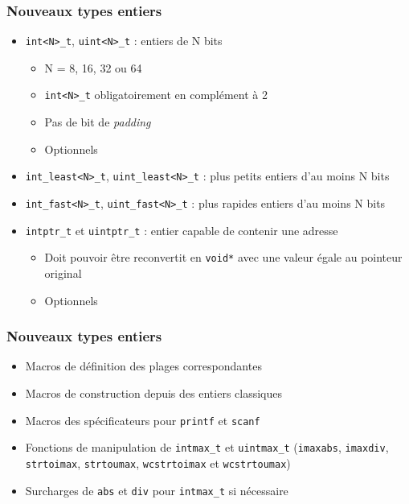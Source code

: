 \documentclass[C++.tex]{subfiles}
\begin{document}
\begin{frame}[fragile]
	\frametitle{Nouveaux types entiers}
	\begin{itemize}
		\item \lstinline|int<N>_t|, \lstinline|uint<N>_t| : entiers de N bits
		\begin{itemize}
			\item N = 8, 16, 32 ou 64
			\item \lstinline|int<N>_t| obligatoirement en complément à 2


			\item Pas de bit de \textit{padding}
			\item Optionnels
		\end{itemize}
		\item \lstinline|int_least<N>_t|, \lstinline|uint_least<N>_t| : plus petits entiers d'au moins N bits
		\item \lstinline|int_fast<N>_t|, \lstinline|uint_fast<N>_t| : plus rapides entiers d'au moins N bits
		\item \lstinline|intptr_t| et \lstinline|uintptr_t| : entier capable de contenir une adresse
		\begin{itemize}
			\item Doit pouvoir être reconvertit en \lstinline|void*| avec une valeur égale au pointeur original
			\item Optionnels
		\end{itemize}
	\end{itemize}
\end{frame}

\begin{frame}[fragile]
	\frametitle{Nouveaux types entiers}
	\begin{itemize}
		\item Macros de définition des plages correspondantes
		\item Macros de construction depuis des entiers \og classiques\fg{}
		\item Macros des spécificateurs pour \lstinline|printf| et \lstinline|scanf|
		\item Fonctions de manipulation de \lstinline|intmax_t| et \lstinline|uintmax_t| (\lstinline|imaxabs|, \lstinline|imaxdiv|, \lstinline|strtoimax|, \lstinline|strtoumax|, \lstinline|wcstrtoimax| et \lstinline|wcstrtoumax|)
		\item Surcharges de \lstinline|abs| et \lstinline|div| pour \lstinline|intmax_t| si nécessaire
	\end{itemize}
\end{frame}
\end{document}
